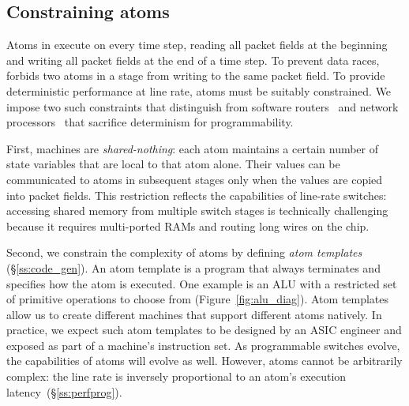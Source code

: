 \subsection{Constraining atoms}
\label{s:atomConstraints}

Atoms in \absmachine execute on every time step, reading all packet fields at
the beginning and writing all packet fields at the end of a time step. To
prevent data races, \absmachine forbids two atoms in a stage from writing to
the same packet field.  To provide deterministic performance at line rate,
atoms must be suitably constrained.  We impose two such constraints that
distinguish \absmachine from software routers~\cite{click} and network
processors~\cite{ixp4xx} that sacrifice determinism for programmability.

First, \absmachine machines are \textit{shared-nothing}: each atom maintains a
certain number of state variables that are local to that atom alone. Their
values can be communicated to atoms in subsequent stages only when the values
are copied into packet fields. This restriction reflects the capabilities of
line-rate switches: accessing shared memory from multiple switch stages is
technically challenging because it requires multi-ported RAMs and routing long
wires on the chip.

Second, we constrain the complexity of atoms by defining {\it atom templates}
(\S\ref{ss:code_gen}).  An atom template is a program that always terminates
and specifies how the atom is executed. One example is an ALU with a restricted
set of primitive operations to choose from (Figure~\ref{fig:alu_diag}). Atom
templates allow us to create different \absmachine machines that support
different atoms natively. In practice, we expect such atom templates to be
designed by an ASIC engineer and exposed as part of a \absmachine machine's
instruction set. As programmable switches evolve, the capabilities of atoms
will evolve as well. However, atoms cannot be arbitrarily complex: the line
rate is inversely proportional to an atom's execution
latency~(\S\ref{ss:perfprog}).
